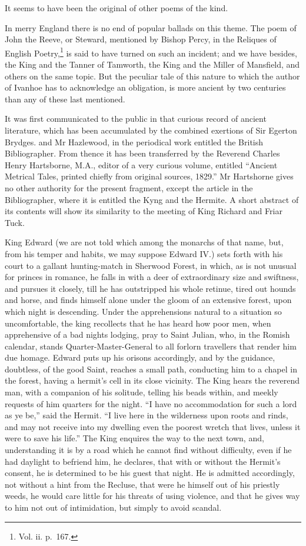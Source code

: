 It seems to have been the original of other poems of the kind.

In merry England there is no end of popular ballads on this theme. The
poem of John the Reeve, or Steward, mentioned by Bishop Percy, in the
Reliques of English Poetry,\footnote{Vol. ii. p.~167.} is said to have
turned on such an
incident; and we have besides, the King and the Tanner of Tamworth, the
King and the Miller of Mansfield, and others on the same topic. But the
peculiar tale of this nature to which the author of Ivanhoe has to
acknowledge an obligation, is more ancient by two centuries than any of
these last mentioned.

It was first communicated to the public in that curious record of
ancient literature, which has been accumulated by the combined exertions
of Sir Egerton Brydges. and Mr Hazlewood, in the periodical work
entitled the British Bibliographer. From thence it has been transferred
by the Reverend Charles Henry Hartsborne, M.A., editor of a very curious
volume, entitled ``Ancient Metrical Tales, printed chiefly from original
sources, 1829.'' Mr Hartshorne gives no other authority for the present
fragment, except the article in the Bibliographer, where it is entitled
the Kyng and the Hermite. A short abstract of its contents will show its
similarity to the meeting of King Richard and Friar Tuck.

King Edward (we are not told which among the monarchs of that name, but,
from his temper and habits, we may suppose Edward IV.) sets forth with
his court to a gallant hunting-match in Sherwood Forest, in which, as is
not unusual for princes in romance, he falls in with a deer of
extraordinary size and swiftness, and pursues it closely, till he has
outstripped his whole retinue, tired out hounds and horse, and finds
himself alone under the gloom of an extensive forest, upon which night
is descending. Under the apprehensions natural to a situation so
uncomfortable, the king recollects that he has heard how poor men, when
apprehensive of a bad nights lodging, pray to Saint Julian, who, in the
Romish calendar, stands Quarter-Master-General to all forlorn travellers
that render him due homage. Edward puts up his orisons accordingly, and
by the guidance, doubtless, of the good Saint, reaches a small path,
conducting him to a chapel in the forest, having a hermit's cell in its
close vicinity. The King hears the reverend man, with a companion of his
solitude, telling his beads within, and meekly requests of him quarters
for the night. ``I have no accommodation for such a lord as ye be,''
said the Hermit. ``I live here in the wilderness upon roots and rinds,
and may not receive into my dwelling even the poorest wretch that lives,
unless it were to save his life.'' The King enquires the way to the next
town, and, understanding it is by a road which he cannot find without
difficulty, even if he had daylight to befriend him, he declares, that
with or without the Hermit's consent, he is determined to be his guest
that night. He is admitted accordingly, not without a hint from the
Recluse, that were he himself out of his priestly weeds, he would care
little for his threats of using violence, and that he gives way to him
not out of intimidation, but simply to avoid scandal.

